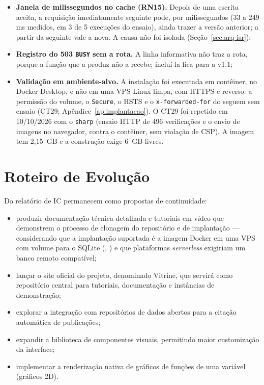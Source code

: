 \begin{itemize}
  \item \textbf{Janela de milissegundos no cache (RN15).} Depois de uma escrita aceita, a requisição imediatamente seguinte pode, por milissegundos (33 a 249 ms medidos, em 3 de 5 execuções do ensaio), ainda trazer a versão anterior; a partir da seguinte vale a nova. A causa não foi isolada (Seção~\ref{sec:arq-isr});
  \item \textbf{Registro do 503 \texttt{BUSY} sem a rota.} A linha informativa não traz a rota, porque a função que a produz não a recebe; incluí-la fica para a v1.1;
  \item \textbf{Validação em ambiente-alvo.} A instalação foi executada em contêiner, no Docker Desktop, e não em uma VPS Linux limpa, com HTTPS e  reverso: a permissão do volume, o  \texttt{Secure}, o HSTS e o \texttt{x-forwarded-for} do  seguem sem ensaio (CT29; Apêndice~\ref{ap:implantacao}). O CT29 foi repetido em 10/10/2026 com o \texttt{sharp} (ensaio HTTP de 496 verificações e o envio de imagens no navegador, contra o contêiner, sem violação de CSP). A imagem tem 2,15~GB e a construção exige 6~GB livres.
\end{itemize}

\section{Roteiro de Evolução}\label{sec:trabalhos-futuros}

Do relatório de IC \cite{reis2026ic} permanecem como propostas de continuidade:

\begin{itemize}
  \item produzir documentação técnica detalhada e tutoriais em vídeo que demonstrem o processo de clonagem do repositório e de implantação --- considerando que a implantação suportada é a imagem Docker em uma VPS com volume para o SQLite (, ) e que plataformas \emph{serverless} exigiriam um banco remoto compatível;
  \item lançar o site oficial do projeto, denominado Vitrine, que servirá como repositório central para tutoriais, documentação e instâncias de demonstração;
  \item explorar a integração com repositórios de dados abertos para a citação automática de publicações;
  \item expandir a biblioteca de componentes visuais, permitindo maior customização da interface;
  \item implementar a renderização nativa de gráficos de funções de uma variável (gráficos 2D).
\end{itemize}

